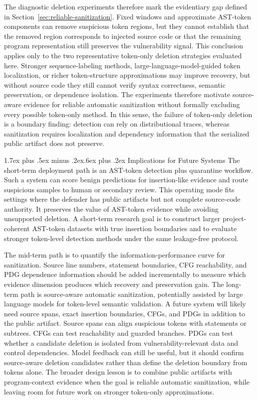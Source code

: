 \documentclass[letterpaper,twocolumn,10pt,twoside]{article}
\makeatletter
\renewcommand\subsection{\@startsection{subsection}{2}{\z@}%
  {1.7ex plus .5ex minus .2ex}{.6ex plus .2ex}%
  {\normalfont\normalsize\bfseries}}
\makeatother
\begin{document}
The diagnostic deletion experiments therefore mark the evidentiary gap defined in Section~\ref{sec:reliable-sanitization}. Fixed windows and approximate AST-token components can remove suspicious token regions, but they cannot establish that the removed region corresponds to injected source code or that the remaining program representation still preserves the vulnerability signal. This conclusion applies only to the two representative token-only deletion strategies evaluated here. Stronger sequence-labeling methods, large-language-model-guided token localization, or richer token-structure approximations may improve recovery, but without source code they still cannot verify syntax correctness, semantic preservation, or dependence isolation. The experiments therefore motivate source-aware evidence for reliable automatic sanitization without formally excluding every possible token-only method. In this sense, the failure of token-only deletion is a boundary finding: detection can rely on distributional traces, whereas sanitization requires localization and dependency information that the serialized public artifact does not preserve.

\subsection{Implications for Future Systems}
The short-term deployment path is an AST-token detection plus quarantine workflow. Such a system can score benign predictions for insertion-like evidence and route suspicious samples to human or secondary review. This operating mode fits settings where the defender has public artifacts but not complete source-code authority. It preserves the value of AST-token evidence while avoiding unsupported deletion. A short-term research goal is to construct larger project-coherent AST-token datasets with true insertion boundaries and to evaluate stronger token-level detection methods under the same leakage-free protocol.

The mid-term path is to quantify the information-performance curve for sanitization. Source line numbers, statement boundaries, CFG reachability, and PDG dependence information should be added incrementally to measure which evidence dimension produces which recovery and preservation gain. The long-term path is source-aware automatic sanitization, potentially assisted by large language models for token-level semantic validation. A future system will likely need source spans, exact insertion boundaries, CFGs, and PDGs in addition to the public artifact. Source spans can align suspicious tokens with statements or subtrees. CFGs can test reachability and guarded branches. PDGs can test whether a candidate deletion is isolated from vulnerability-relevant data and control dependencies. Model feedback can still be useful, but it should confirm source-aware deletion candidates rather than define the deletion boundary from tokens alone. The broader design lesson is to combine public artifacts with program-context evidence when the goal is reliable automatic sanitization, while leaving room for future work on stronger token-only approximations.
\end{document}

